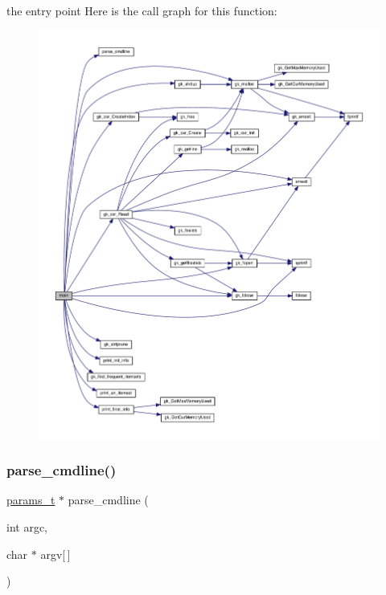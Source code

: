 the entry point Here is the call graph for this function\+:\nopagebreak
\begin{figure}[H]
\begin{center}
\leavevmode
\includegraphics[width=350pt]{a00146_a0ddf1224851353fc92bfbff6f499fa97_cgraph}
\end{center}
\end{figure}
\mbox{\label{a00146_aea2aa8c9b5bb7c64a3f316d7760f0341}} 
\subsubsection{\texorpdfstring{parse\+\_\+cmdline()}{parse\_cmdline()}}
{\footnotesize\ttfamily \hyperlink{a00706}{params\+\_\+t} $\ast$ parse\+\_\+cmdline (\begin{DoxyParamCaption}\item[{int}]{argc,  }\item[{char $\ast$}]{argv\mbox{[}$\,$\mbox{]} }\end{DoxyParamCaption})}

